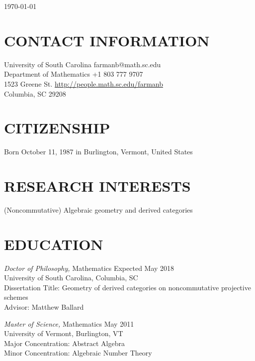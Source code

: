 \documentclass[line,overlapped]{res}
\begin{document}
\hfill \today

\begin{resume}

  \section{CONTACT INFORMATION}
  University of South Carolina \hfill farmanb@math.sc.edu\\
  Department of Mathematics \hfill +1 803 777 9707\\
  1523 Greene St. \hfill \hyperref[http://people.math.sc.edu/farmanb]{http://people.math.sc.edu/farmanb}\\
  Columbia, SC 29208

  \section{CITIZENSHIP}
  Born October 11, 1987 in Burlington, Vermont, United States

  \section{RESEARCH INTERESTS}
  (Noncommutative) Algebraic geometry and derived categories
  \section{EDUCATION} 
          \textsl{Doctor of Philosophy,} Mathematics \hfill Expected May 2018\\
          University of South Carolina, Columbia, SC\\
          Dissertation Title: Geometry of derived categories on noncommutative projective schemes\\
          Advisor: Matthew Ballard

          \textsl{Master of Science,} Mathematics \hfill May 2011\\
          University of Vermont, Burlington, VT\\
          Major Concentration: Abstract Algebra\\
          Minor Concentration: Algebraic Number Theory


\end{resume}
\end{document}
